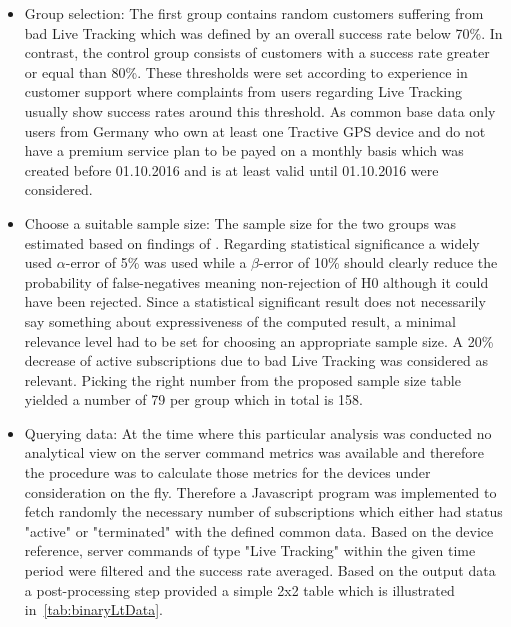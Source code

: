 \begin{enumerate}
	\begin{itemize}
		\item Group selection: The first group contains random customers suffering from bad Live Tracking which was defined by an overall success rate below 70\%. In contrast, the control group consists of customers with a success rate greater or equal than 80\%. These thresholds were set according to experience in customer support where complaints from users regarding Live Tracking usually show success rates around this threshold. As common base data only users from Germany who own at least one Tractive GPS device and do not have a premium service plan to be payed on a monthly basis which was created before 01.10.2016 and is at least valid until 01.10.2016 were considered. 
		\item Choose a suitable sample size: The sample size for the two groups was estimated based on findings of \cite{campbell1995estimating}. Regarding statistical significance a widely used $\alpha$-error of 5\% was used while a $\beta$-error of 10\% should clearly reduce the probability of false-negatives meaning non-rejection of H0 although it could have been rejected. Since a statistical significant result does not necessarily say something about expressiveness of the computed result, a minimal relevance level had to be set for choosing an appropriate sample size. A 20\% decrease of active subscriptions due to bad Live Tracking was considered as relevant. Picking the right number from the proposed sample size table yielded a number of 79 per group which in total is 158. 
		\item Querying data: At the time where this particular analysis was conducted no analytical view on the server command metrics was available and therefore the procedure was to calculate those metrics for the devices under consideration on the fly. Therefore a Javascript program was implemented to fetch randomly the necessary number of subscriptions which either had status "active" or "terminated" with the defined common data. Based on the device reference, server commands of type "Live Tracking" within the given time period were filtered and the success rate averaged. Based on the output data a post-processing step provided a simple 2x2 table which is illustrated in~\ref{tab:binaryLtData}. 
		

\end{itemize}
\end{enumerate}
